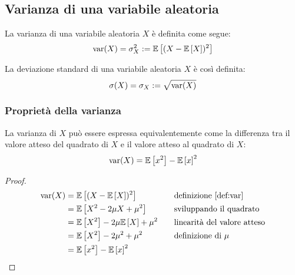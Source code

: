\subsection{Varianza di una variabile aleatoria}
\begin{defin} \label{def:var}
	La varianza di una variabile aleatoria $X$ è definita come segue:
	\begin{equation*}
		\operatorname{var}(X) = \sigma^2_X := \mathbb{E}\left[ (X-\mathbb{E}\left[ X \right])^2 \right]
	\end{equation*}
\end{defin}

\begin{defin}
	La deviazione standard di una variabile aleatoria $X$ è così definita:
	\begin{equation*}
		\sigma(X) = \sigma_X :=\sqrt{\operatorname{var}(X)}
	\end{equation*}
\end{defin}


\subsubsection{Proprietà della varianza}
\begin{prop} \label{prop:varalt}
	La varianza di $X$ può essere espressa equivalentemente come la differenza tra il valore atteso del quadrato di $X$ e il valore atteso al quadrato di $X$:
	\begin{equation} \label{eq:varalt}
		\operatorname{var}(X) = \mathbb{E}\left[ x^2 \right]- \mathbb{E}\left[ x \right]^2
	\end{equation}
\end{prop}
\begin{proof}
	\begin{align*}
		\operatorname{var}(X) & = \mathbb{E}\left[ (X-\mathbb{E}\left[ X \right])^2 \right]          & \quad & \text{definizione \ref{def:var}}   \\
		        & = \mathbb{E}\left[ X^2-2\mu X+\mu^2 \right]      & \quad & \text{sviluppando il quadrato}     \\
		        & = \mathbb{E}\left[ X^2 \right]-2\mu \mathbb{E}\left[ X \right]+\mu^2 & \quad & \text{linearità del valore atteso} \\
		        & = \mathbb{E}\left[ X^2 \right]-2\mu^2+\mu^2      & \quad & \text{definizione di $\mu$}        \\
		        & = \mathbb{E}\left[ x^2 \right]- \mathbb{E}\left[ x \right]^2
	\end{align*}
\end{proof}

